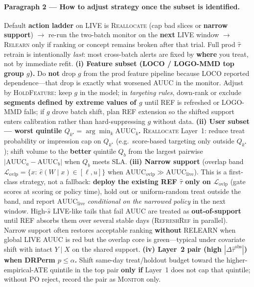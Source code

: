 \documentclass{article}
\begin{document}
\paragraph{Paragraph 2 --- How to adjust strategy once the subset is identified.}
Default \textbf{action ladder} on LIVE is \textsc{Reallocate} (cap bad slices or \textbf{narrow support}) $\rightarrow$ re-run the two-batch monitor on the \textbf{next} LIVE window $\rightarrow$ \textsc{Relearn} only if ranking or concept remains broken after that trial.
Full prod $\hat\tau$ retrain is intentionally \emph{last}: most cross-batch alerts are fixed by \textbf{where} you treat, not by immediate refit.
\textbf{(i) Feature subset (LOCO / LOGO-MMD top group $g$).}
Do \textbf{not} drop $g$ from the prod feature pipeline because LOCO reported dependence---that drop is exactly what worsened AUUC in the monitor.
Adjust by \textsc{HoldFeature}: keep $g$ in the model; in \emph{targeting rules}, down-rank or exclude \textbf{segments defined by extreme values of $g$} until REF is refreshed or LOGO-MMD falls; if $g$ drove batch shift, plan REF extension so the shifted support enters calibration rather than hard-suppressing $g$ without data.
\textbf{(ii) User subset --- worst quintile $Q_{k^\star}=\arg\min_k \mathrm{AUUC}_k$.}
\textsc{Reallocate} Layer~1: reduce treat probability or impression cap on $Q_{k^\star}$ (e.g.\ score-based targeting only outside $Q_{k^\star}$); shift volume to the \textbf{better} quintile $Q_b$ from the largest pairwise $|\mathrm{AUUC}_a-\mathrm{AUUC}_b|$ when $Q_b$ meets SLA.
\textbf{(iii) Narrow support} (overlap band $\mathcal{L}_{\mathrm{ovlp}}=\{x:\ \hat e(W\mid x)\in[\ell,u]\}$ when $\mathrm{AUUC}_{\mathrm{ovlp}}\gg \mathrm{AUUC}_{\mathrm{live}}$).
This is a first-class strategy, not a fallback: \textbf{deploy the existing REF $\hat\tau$ only on $\mathcal{L}_{\mathrm{ovlp}}$} (gate scores at scoring or policy time), hold out or uniform-random treat outside the band, and report $\mathrm{AUUC}_{\mathrm{live}}$ \emph{conditional on the narrowed policy} in the next window.
High-$\hat s$ LIVE-like tails that fail AUUC are treated as \textbf{out-of-support} until REF absorbs them over several stable days (\textsc{RefreshRef} in parallel).
Narrow support often restores acceptable ranking \textbf{without} RELEARN when global LIVE AUUC is red but the overlap core is green---typical under covariate shift with intact $Y\mid X$ on the shared support.
\textbf{(iv) Layer~2 pair (high $|\Delta\widehat{\tau}^{\mathrm{obs}}|$) when DRPerm $p\le\alpha$.}
Shift same-day treat/holdout budget toward the higher-empirical-ATE quintile in the top pair \textbf{only if} Layer~1 does not cap that quintile; without PO reject, record the pair as \textsc{Monitor} only.
\end{document}
